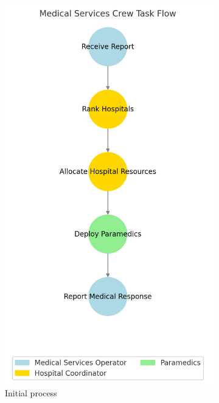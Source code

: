 \begin{figure}[H]
    \centering
    \begin{subfigure}[b]{0.28\textwidth}
        \centering
        \includegraphics[width=\textwidth]{figures/Medical_Services_Crew_Flow.png}
        \caption{Initial process}
        \label{fig:initial_process}
    \end{subfigure}
    \hfill
    \begin{subfigure}[b]{0.7\textwidth}

\end{subfigure}
\end{figure}
